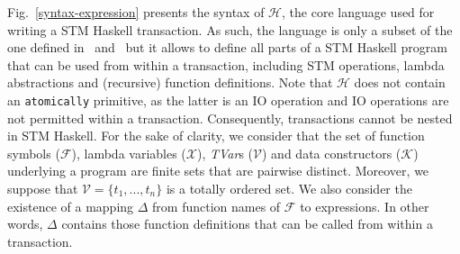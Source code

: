 \documentclass[submission,copyright,creativecommons]{eptcs}
\begin{document}
Fig.~\ref{syntax-expression} presents the syntax of $\mathcal{H}$, the core language used for writing a STM Haskell transaction. As such, the language is only a subset of the one defined in~\cite{composable-memory-transactions} and~\cite{compositional-theory-stm} but it allows to define all parts of a STM Haskell program that can be used from within a transaction, including STM operations, lambda abstractions and (recursive) function definitions. Note that $\mathcal{H}$ does not contain an \texttt{atomically} primitive, as the latter is an IO operation and IO operations are not permitted within a transaction. Consequently, transactions cannot be nested in STM Haskell.
For the sake of clarity, we consider that the set of function symbols ($\mathcal{F}$), lambda variables ($\mathcal{X}$), \emph{TVar}s ($\mathcal{V}$) and data constructors ($\mathcal{K}$) underlying a program are finite sets that are pairwise distinct. 
Moreover, we suppose that $\mathcal{V} = \{ t_1, ... ,t_n \}$ is a totally ordered set. We also consider the existence of a mapping $\Delta$ from function names of $\mathcal{F}$ to expressions. In other words, $\Delta$ contains those function definitions that can be called from within a transaction.
\end{document}
